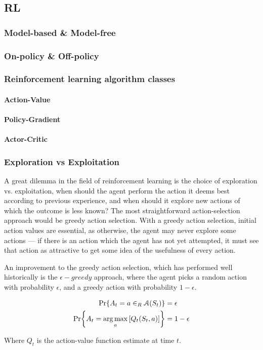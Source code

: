 \subsection{RL}



\subsubsection{Model-based \& Model-free}

\subsubsection{On-policy \& Off-policy}

\subsubsection{Reinforcement learning algorithm classes}
\paragraph{Action-Value}
\paragraph{Policy-Gradient}
\paragraph{Actor-Critic}

\subsubsection{Exploration vs Exploitation}
A great dilemma in the field of reinforcement learning is the choice of exploration vs. exploitation, when should the agent perform the action it deems best according to previous experience, and when should it explore new actions of which the outcome is less known? 
The most straightforward action-selection approach would be greedy action selection. With a greedy action selection, initial action values are essential, as otherwise, the agent may never explore some actions --- if there is an action which the agent has not yet attempted, it must see that action as attractive to get some idea of the usefulness of every action. 

An improvement to the greedy action selection, which has performed well historically is the $\epsilon-greedy$ approach, where the agent picks a random action with probability $\epsilon$, and a greedy action with probability $1-\epsilon$.

\begin{align}
    {{\rm Pr\!}\left\{A_t = a \in_R \ensuremath{\mathcal{A}}(S_t)\right\}} &= \epsilon\\
    {{\rm Pr\!}\left\{A_t = \operatorname*{arg\,max}_a \left[Q_t(S_t,a)\right]\right\}} &= 1-\epsilon
\end{align}

Where $Q_t$ is the action-value function estimate at time $t$.